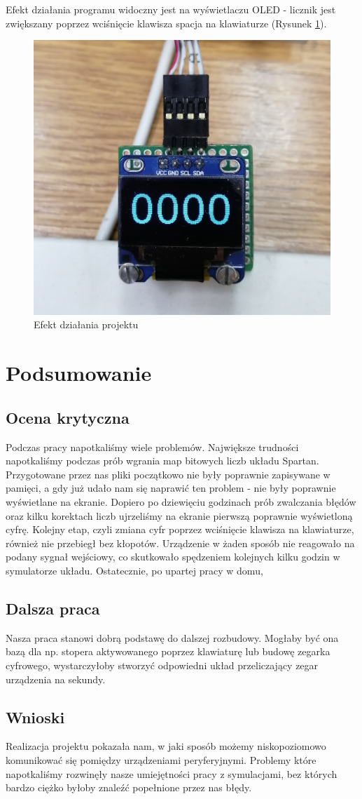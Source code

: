 \documentclass[]{article}
\begin{document}
	Efekt działania programu widoczny jest na wyświetlaczu OLED - licznik jest zwiększany poprzez wciśnięcie klawisza spacja na klawiaturze (Rysunek \ref{fig:result}).
	\begin{figure}[H]
		\includegraphics[width=.5\linewidth]{img/result.jpg}
		\centering
		\caption{Efekt działania projektu}
		\label{fig:result}
	\end{figure}

	
	\section{Podsumowanie}
	\subsection{Ocena krytyczna}
	Podczas pracy napotkaliśmy wiele problemów. Największe trudności napotkaliśmy podczas prób wgrania map bitowych liczb układu Spartan. Przygotowane przez nas pliki początkowo nie były poprawnie zapisywane w pamięci, a gdy już udało nam się naprawić ten problem - nie były poprawnie wyświetlane na ekranie. Dopiero po dziewięciu godzinach prób zwalczania błędów oraz kilku korektach liczb ujrzeliśmy na ekranie pierwszą poprawnie wyświetloną cyfrę. Kolejny etap, czyli zmiana cyfr poprzez wciśnięcie klawisza na klawiaturze, również nie przebiegł bez kłopotów. Urządzenie w żaden sposób nie reagowało na podany sygnał wejściowy, co skutkowało spędzeniem kolejnych kilku godzin w symulatorze układu. Ostatecznie, po upartej pracy w domu, %
	
	\subsection{Dalsza praca}
	Nasza praca stanowi dobrą podstawę do dalszej rozbudowy. Mogłaby być ona bazą dla np. stopera aktywowanego poprzez klawiaturę lub budowę zegarka cyfrowego, wystarczyłoby stworzyć odpowiedni układ przeliczający zegar urządzenia na sekundy. 
	
	\subsection{Wnioski}
	Realizacja projektu pokazała nam, w jaki sposób możemy niskopoziomowo komunikować się pomiędzy urządzeniami peryferyjnymi. Problemy które napotkaliśmy rozwinęły nasze umiejętności pracy z symulacjami, bez których bardzo ciężko byłoby znaleźć popełnione przez nas błędy.
	\newpage
	
	
\end{document}
